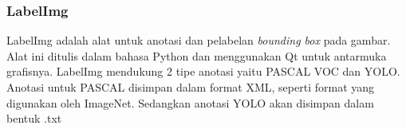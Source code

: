 \documentclass[../thesis.tex]{subfiles}
\begin{document}
\subsubsection{LabelImg}
LabelImg adalah alat untuk anotasi dan pelabelan \textit{bounding box} pada gambar. Alat ini ditulis dalam bahasa Python dan menggunakan Qt untuk antarmuka grafisnya. LabelImg mendukung 2 tipe anotasi yaitu PASCAL VOC dan YOLO. 
Anotasi untuk PASCAL disimpan dalam format XML, seperti format yang digunakan oleh ImageNet. Sedangkan anotasi YOLO akan disimpan dalam bentuk .txt \cite{LabelImg}
\end{document}
